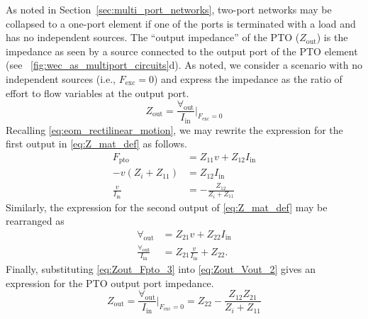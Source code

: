 \documentclass[twocolumn]{autart}
\begin{document}
As noted in Section~\ref{sec:multi_port_networks}, two-port networks may be collapsed to a one-port element if one of the ports is terminated with a load and has no independent sources.
The ``output impedance'' of the PTO ($Z_{\textrm{out}}$) is the impedance as seen by a source connected to the output port of the PTO element (see \figurename~\ref{fig:wec_as_multiport_circuits}d).
As noted, we consider a scenario with no independent sources (i.e., $F_{\textrm{exc}} = 0$) and express the impedance as the ratio of effort to flow variables at the output port. 
%
\begin{equation}
        Z_{\textrm{out}} = \frac{\forall_{\textrm{out}}}{I_{\textrm{in}}} \bigg\vert_{F_{\textrm{exc}}=0}
        \label{eq:Zout_1}
\end{equation}
%
Recalling \eqref{eq:eom_rectilinear_motion}, we may rewrite the expression for the first output in \eqref{eq:Z_mat_def} as follows.
%
\begin{subequations}
        \begin{align}
                F_{\textrm{pto}} &= Z_{11} v + Z_{12} I_{\textrm{in}} \label{eq:Zout_Fpto_1} \\[0.5em]
                -v (Z_i + Z_{11}) &= Z_{12} I_{\textrm{in}} \label{eq:Zout_Fpto_2} \\[0.5em]
                \frac{v}{I_{\textrm{in}}} &= -\frac{Z_{12}}{Z_i + Z_{11}} \label{eq:Zout_Fpto_3}
        \end{align}
        \label{eq:Zout_Fpto}%
\end{subequations}
%
Similarly, the expression for the second output of \eqref{eq:Z_mat_def} may be rearranged as
%
\begin{subequations}
        \begin{align}
                \forall_{\textrm{out}} &= Z_{21} v + Z_{22} I_{\textrm{in}} \label{eq:Zout_Vout_1} \\[0.5em]
                \frac{\forall_{\textrm{out}}}{I_{\textrm{in}}} &= Z_{21} \frac{v}{I_{\textrm{in}}} + Z_{22} . \label{eq:Zout_Vout_2}
        \end{align} 
        \label{eq:Zout_Vout}%
\end{subequations}
%
Finally, substituting \eqref{eq:Zout_Fpto_3} into \eqref{eq:Zout_Vout_2} gives an expression for the PTO output port impedance.
%
\begin{equation}
        Z_{\textrm{out}} = \frac{\forall_{\textrm{out}}}{I_{\textrm{in}}} \bigg\vert_{F_{\textrm{exc}}=0} = Z_{22} - \frac{Z_{12} Z_{21}}{Z_{i} + Z_{11}}
        \label{eq:pto_output_port_impedance}
\end{equation}
\end{document}
